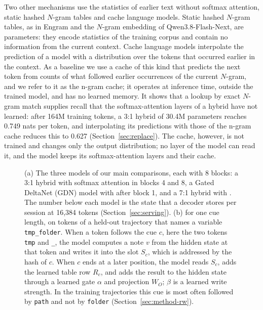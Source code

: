 Two other mechanisms use the statistics of earlier text without softmax attention, static hashed
$N$-gram tables and cache language models. Static hashed $N$-gram tables, as in Engram \citep{engram2026} and the $N$-gram embedding of Qwen3.8-Flash-Next, are
parameters: they encode statistics of the training corpus and contain no information from the
current context. Cache language models \citep{kuhn1990,grave2017} interpolate the prediction of a
model with a distribution over the tokens that occurred earlier in the context. As a baseline we
use a cache of this kind that predicts the next token from counts of what followed earlier
occurrences of the current $N$-gram, and we refer to it as the n-gram cache; it operates at
inference time, outside the trained model, and has no learned memory. It shows that a lookup by exact $N$-gram match supplies recall that the
softmax-attention layers of a hybrid have not learned: after 164M training tokens, a 3:1 hybrid of
30.4M parameters reaches 0.749 nats per token, and interpolating its predictions with those of the
n-gram cache reduces this to 0.627 (Section~\ref{sec:replace}). The cache, however, is not trained
and changes only the output distribution; no layer of the model can read it, and the model keeps
its softmax-attention layers and their cache.

\begin{figure}[t]
\centering
\resizebox{\textwidth}{!}{}
\caption{(a) The three models of our main comparisons, each with 8 blocks: a 3:1 hybrid with softmax
attention in blocks 4 and 8, a Gated DeltaNet (GDN) model with \ingram{} after block 1, and a 7:1
hybrid with \ingram{}. The number below each model is the state that a decoder stores per session
at 16,384 tokens (Section~\ref{sec:serving}). (b) \ingram{} for one cue length, on tokens of a
held-out trajectory that names a variable \texttt{tmp\_folder}. When a token follows the cue $c$,
here the two tokens \texttt{tmp} and \texttt{\_}, the model computes a note $v$ from the hidden
state at that token and writes it into the slot $S_c$, which is addressed by the hash of $c$. When
$c$ ends at a later position, the model reads $S_c$, adds the learned table row $R_c$, and adds the
result to the hidden state through a learned gate $\alpha$ and projection $W_O$; $\beta$ is a
learned write strength. In the training trajectories this cue is most often followed by
\texttt{path} and not by \texttt{folder} (Section~\ref{sec:method-rw}).}
\label{fig:overview}
\end{figure}

